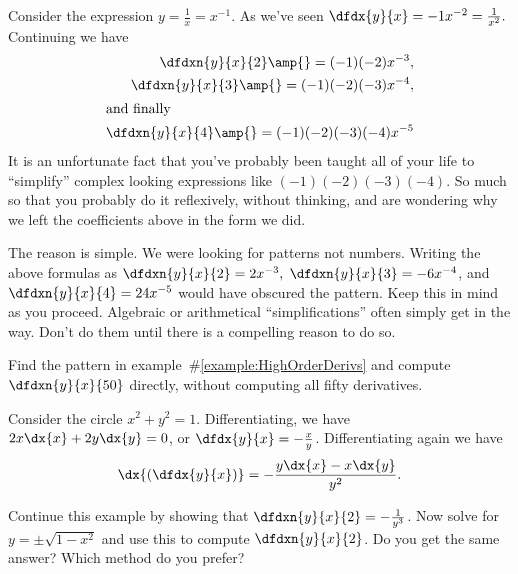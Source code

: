 \begin{myexample}
  \label{example:HighOrderDerivs}{}
  Consider the expression $y=\frac1x =x^{-1}$. As we've seen
  $\dfdx{y}{x}= -1x^{-2}
  =\frac{1}{x^2}.$ Continuing we have
  \begin{align*}
  \dfdxn{y}{x}{2} \amp{}= (-1)(-2)x^{-3},\\
    \dfdxn{y}{x}{3} \amp{}= (-1)(-2)(-3)x^{-4},\\
    \intertext{and finally}
    \dfdxn{y}{x}{4} \amp{}= (-1)(-2)(-3)(-4)x^{-5}
  \end{align*}
  It is an unfortunate fact that you've probably been taught all of
  your life to ``simplify'' complex looking expressions like
  $(-1)(-2)(-3)(-4)$. So much so that you probably do it reflexively,
  without thinking, and are wondering why we left the coefficients
  above in the form we did.  

The reason is simple. We were looking for patterns not numbers.
Writing the above formulas as $\dfdxn{y}{x}{2} = 2x^{-3},$
$\dfdxn{y}{x}{3} = -6x^{-4}$, and $\dfdxn{y}{x}{4} = 24x^{-5}$ would
have obscured the pattern.
Keep this in mind as you proceed.  Algebraic or arithmetical
``simplifications'' often simply get in the way. Don't do them until
there is a compelling reason to do so.


\begin{ProficiencyDrill-1line}
    Find the pattern in example~\#\ref{example:HighOrderDerivs} and
    compute $\dfdxn{y}{x}{50}$ directly, without computing all fifty
    derivatives.
  \end{ProficiencyDrill-1line}
\end{myexample}


\begin{myexample}
  Consider the circle $x^2+y^2=1$. Differentiating, we have
  $
  2x\dx{x}+2y\dx{y}=0$, or
  $\dfdx{y}{x}=-\frac{x}{y}$.
  Differentiating again we have
  $$
  \dx{\left(\dfdx{y}{x}\right)}=-\frac{y\dx{x}-x\dx{y}}{y^2}.
  $$
\end{myexample}

  \begin{embeddedproblem}
    Continue this example by showing that
    $  \dfdxn{y}{x}{2}=-\frac{1}{y^3}$.
    Now solve for $y=\pm\sqrt{1-x^2}$ and use this to compute
    $\dfdxn{y}{x}{2}$. Do you get the same answer? Which method do you
    prefer?
  \end{embeddedproblem}

